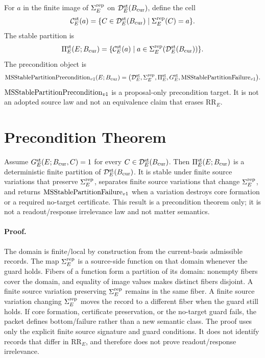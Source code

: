 \begin{definition}
For \(a\) in the finite image of \(\Sigma^{\mathrm{rep}}_E\) on
\(\mathcal D^{\mathrm{st}}_E(B_{\mathrm{cur}})\), define the cell
\[
  \mathcal C^{\mathrm{st}}_E(a)=
  \{C\in\mathcal D^{\mathrm{st}}_E(B_{\mathrm{cur}})\mid \Sigma^{\mathrm{rep}}_E(C)=a\}.
\]
The stable partition is
\[
  \Pi^{\mathrm{st}}_E(E;B_{\mathrm{cur}})=
  \{\mathcal C^{\mathrm{st}}_E(a)\mid a\in
  \Sigma^{\mathrm{rep}}_E(\mathcal D^{\mathrm{st}}_E(B_{\mathrm{cur}}))\}.
\]
The precondition object is
\[
  \mathrm{MSStablePartitionPrecondition}_{v1}(E;B_{\mathrm{cur}})=
  \bigl(\mathcal D^{\mathrm{st}}_E,\Sigma^{\mathrm{rep}}_E,\Pi^{\mathrm{st}}_E,G^{\mathrm{st}}_E,\mathrm{MSStablePartitionFailure}_{v1}\bigr).
\]
\(\mathrm{MSStablePartitionPrecondition}_{v1}\) is a proposal-only precondition target. It is not an
adopted source law and not an equivalence claim that erases
\(\mathrm{RR}_E\).
\end{definition}

\section{Precondition Theorem}

\begin{proposition}
Assume \(G^{\mathrm{st}}_E(E;B_{\mathrm{cur}},C)=1\) for every
\(C\in\mathcal D^{\mathrm{st}}_E(B_{\mathrm{cur}})\). Then
\(\Pi^{\mathrm{st}}_E(E;B_{\mathrm{cur}})\) is a deterministic finite partition of
\(\mathcal D^{\mathrm{st}}_E(B_{\mathrm{cur}})\). It is stable under finite
source variations that preserve \(\Sigma^{\mathrm{rep}}_E\), separates finite source
variations that change \(\Sigma^{\mathrm{rep}}_E\), and returns \(\mathrm{MSStablePartitionFailure}_{v1}\) when a variation
destroys core formation or a required no-target certificate. This result is a
precondition theorem only; it is not a readout/response irrelevance law and
not matter semantics.
\end{proposition}

\paragraph{Proof.}
The domain is finite/local by construction from the current-basis admissible
records. The map \(\Sigma^{\mathrm{rep}}_E\) is a source-side function on that domain whenever
the guard holds. Fibers of a function form a partition of its domain:
nonempty fibers cover the domain, and equality of image values makes distinct
fibers disjoint. A finite source variation preserving
\(\Sigma^{\mathrm{rep}}_E\) remains in the same fiber. A finite source variation changing
\(\Sigma^{\mathrm{rep}}_E\) moves the record to a different fiber when the guard still holds.
If core formation, certificate preservation, or the no-target guard fails,
the packet defines bottom/failure rather than a new semantic class. The proof
uses only the explicit finite source signature and guard conditions. It does
not identify records that differ in \(\mathrm{RR}_E\), and therefore does not
prove readout/response irrelevance.

